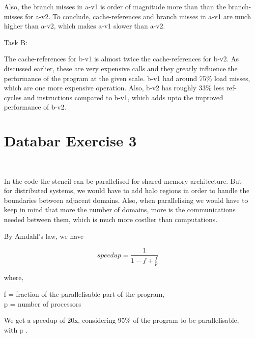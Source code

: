 \documentclass[acmlarge,screen,nonacm]{acmart}
\begin{document}
Also, the branch misses in a-v1 is order of magnitude more than than the branch-misses for a-v2. To conclude, cache-references and branch misses in a-v1 are much higher than a-v2, which makes a-v1 slower than a-v2.\

Task B:

The cache-references for b-v1 is almost twice the cache-references for b-v2. As discussed earlier, these are very expensive calls and they greatly influence the performance of the program at the given scale. b-v1 had around 75\% load misses, which are one more expensive operation. Also, b-v2 has roughly 33\% less ref-cycles and instructions compared to b-v1, which adds upto the improved performance of b-v2.

\section{Databar Exercise 3} \

In the code the stencil can be parallelised for shared memory architecture. But for distributed systems, we would have to add halo regions in order to handle the boundaries between adjacent domains. Also, when parallelising we would have to keep in mind that more the number of domains, more is the communications needed between them, which is much more costlier than computations.

By Amdahl's law, we have 

\begin{equation}
    speedup = \frac{1}{1 -f + \frac{f}{p}}
\end{equation}

where,
\begin{center}
    f = fraction of the parallelisable part of the program, \\
    p = number of processors
\end{center}
 We get a speedup of 20x, considering 95\% of the program to be parallelisable, with p \rightarrow \infty.
\end{document}
